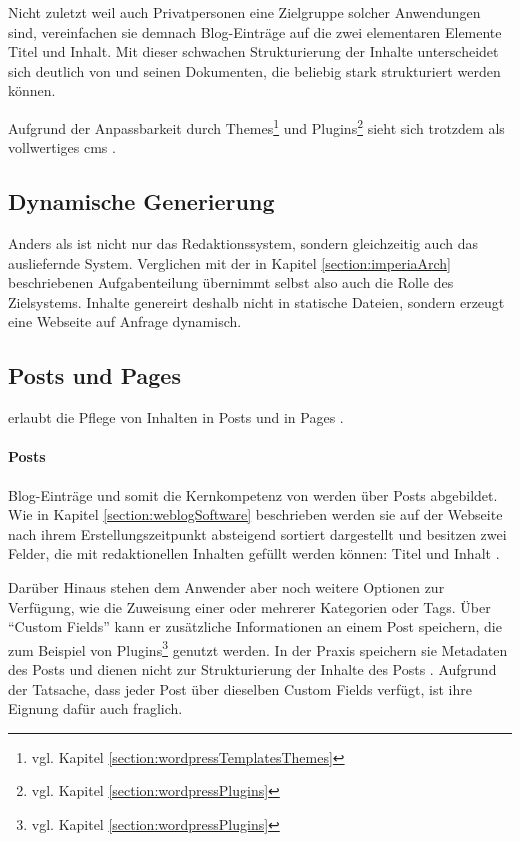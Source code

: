         Nicht zuletzt weil auch Privatpersonen eine Zielgruppe
        solcher Anwendungen sind, vereinfachen sie demnach Blog-Einträge
        auf die zwei elementaren Elemente Titel und Inhalt.
        Mit dieser schwachen Strukturierung der Inhalte
        unterscheidet sich {\wordpress} deutlich von {\imperia}
        und seinen Dokumenten, die beliebig stark strukturiert
        werden können.

        Aufgrund der Anpassbarkeit durch Themes\footnote{vgl. Kapitel \ref{section:wordpressTemplatesThemes}}
        und Plugins\footnote{vgl. Kapitel \ref{section:wordpressPlugins}} sieht sich
        {\wordpress} trotzdem als vollwertiges \gls{cms}
        \cite{wordpress:About}.

    \subsection{Dynamische Generierung}
        Anders als {\imperia} ist {\wordpress} nicht nur das Redaktionssystem,
        sondern gleichzeitig auch das ausliefernde System.
        Verglichen mit der in Kapitel \ref{section:imperiaArch}
        beschriebenen Aufgabenteilung übernimmt {\wordpress} selbst
        also auch die Rolle des Zielsystems.
        Inhalte genereirt {\wordpress} deshalb nicht in statische Dateien,
        sondern erzeugt eine Webseite auf Anfrage dynamisch.

    \subsection{Posts und Pages}
        \label{section:wordpressPostsPages}
        {\wordpress} erlaubt die Pflege von Inhalten in Posts
        und in Pages \cite{wordpress:Pages}.

        \paragraph*{Posts}
        Blog-Einträge und somit die Kernkompetenz von
        {\wordpress} werden über Posts abgebildet.
        Wie in Kapitel \ref{section:weblogSoftware} beschrieben werden sie
        auf der Webseite nach ihrem Erstellungszeitpunkt absteigend sortiert dargestellt
        und besitzen zwei Felder, die mit redaktionellen Inhalten gefüllt werden können:
        Titel und Inhalt \cite{wordpress:Posts}.
        
        Darüber Hinaus stehen dem Anwender aber noch weitere Optionen zur
        Verfügung, wie die Zuweisung einer oder mehrerer Kategorien oder Tags.
        Über "`Custom Fields"' kann er zusätzliche Informationen an einem Post
        speichern, die zum Beispiel von Plugins\footnote{vgl. Kapitel \ref{section:wordpressPlugins}}
        genutzt werden.
        In der Praxis speichern sie Metadaten des Posts und dienen nicht zur Strukturierung
        der Inhalte des Posts \cite{wordpress:Posts}.
        Aufgrund der Tatsache, dass jeder Post über dieselben Custom Fields verfügt,
        ist ihre Eignung dafür auch fraglich.

